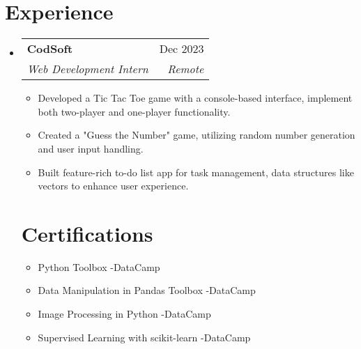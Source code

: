 \documentclass[letterpaper,11pt]{article}
\makeatletter
\newcommand{\resumeItem}[1]{
  \item\small{
    {#1 \vspace{-2pt}}
  }
}
\newcommand{\resumeSubheading}[4]{
  \vspace{-2pt}\item
    \begin{tabular*}{0.97\textwidth}[t]{l@{\extracolsep{\fill}}r}
      \textbf{#1} & #2 \\
      \textit{\small#3} & \textit{\small #4} \\
    \end{tabular*}\vspace{-7pt}
}
\newcommand{\resumeSubHeadingListStart}{\begin{itemize}[leftmargin=0.15in, label={}]}
\newcommand{\resumeSubHeadingListEnd}{\end{itemize}}
\newcommand{\resumeItemListStart}{\begin{itemize}}
\newcommand{\resumeItemListEnd}{\end{itemize}\vspace{-5pt}}
\makeatother
\begin{document}
\section{Experience}
  \resumeSubHeadingListStart
    \resumeSubheading
      {CodSoft}{Dec 2023}
      {Web Development Intern}{Remote}
      \resumeItemListStart
        \resumeItem{Developed a Tic Tac Toe game with a console-based interface, implement both two-player and one-player functionality.}
        \resumeItem{Created a "Guess the Number" game, utilizing random number generation and user input handling.}
        \resumeItem{Built feature-rich to-do list app for task management, data structures like vectors to enhance user experience.}
      \resumeItemListEnd
\section{Certifications}
      \resumeItemListStart
        \resumeItem{Python Toolbox -DataCamp}
        \resumeItem{Data Manipulation in Pandas Toolbox -DataCamp}
        \resumeItem{Image Processing in Python -DataCamp}
        \resumeItem{Supervised Learning with scikit-learn -DataCamp}
      \resumeItemListEnd


  \resumeSubHeadingListEnd


\end{document}
